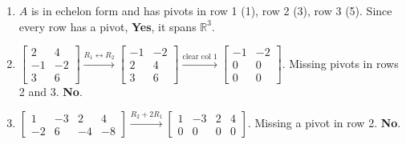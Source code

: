 \documentclass[12pt]{article}
\begin{document}
\begin{enumerate}
    \item $A$ is in echelon form and has pivots in row 1 (1), row 2 (3), row 3 (5). Since every row has a pivot, \textbf{Yes}, it spans $\mathbb{R}^3$.
    \item $\begin{bmatrix} 2 & 4 \\ -1 & -2 \\ 3 & 6 \end{bmatrix} \xrightarrow{R_1 \leftrightarrow R_2} \begin{bmatrix} -1 & -2 \\ 2 & 4 \\ 3 & 6 \end{bmatrix} \xrightarrow{\text{clear col 1}} \begin{bmatrix} -1 & -2 \\ 0 & 0 \\ 0 & 0 \end{bmatrix}$. Missing pivots in rows 2 and 3. \textbf{No}.
    \item $\begin{bmatrix} 1 & -3 & 2 & 4 \\ -2 & 6 & -4 & -8 \end{bmatrix} \xrightarrow{R_2+2R_1} \begin{bmatrix} 1 & -3 & 2 & 4 \\ 0 & 0 & 0 & 0 \end{bmatrix}$. Missing a pivot in row 2. \textbf{No}.


\end{enumerate}
\end{document}
